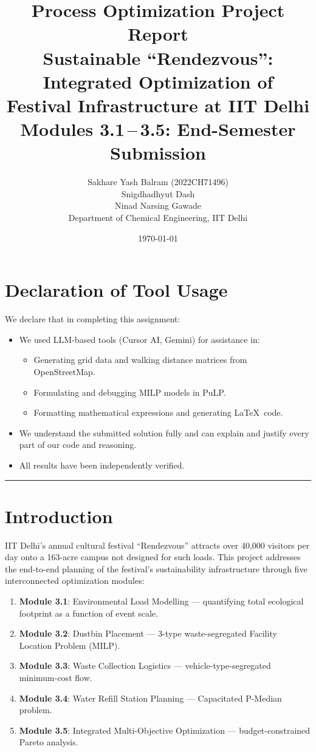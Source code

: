 \documentclass[11pt,a4paper]{article}
\title{\textbf{Process Optimization Project Report}\\[0.3cm]
\Large Sustainable ``Rendezvous'': Integrated Optimization of\\Festival Infrastructure at IIT Delhi\\[0.3cm]
\large Modules 3.1\,--\,3.5: End-Semester Submission}
\author{
    Sakhare Yash Balram (2022CH71496) \\
    Snigdhadhyut Dash \\
    Ninad Narsing Gawade \\[0.2cm]
    \small Department of Chemical Engineering, IIT Delhi
}
\date{\today}
\begin{document}
\maketitle

\section*{Declaration of Tool Usage}
We declare that in completing this assignment:
\begin{itemize}
    \item We used LLM-based tools (Cursor AI, Gemini) for assistance in:
    \begin{itemize}
        \item Generating grid data and walking distance matrices from OpenStreetMap.
        \item Formulating and debugging MILP models in PuLP.
        \item Formatting mathematical expressions and generating \LaTeX\ code.
    \end{itemize}
    \item We understand the submitted solution fully and can explain and justify every part of our code and reasoning.
    \item All results have been independently verified.
\end{itemize}

\vspace{0.3cm}\hrule\vspace{0.5cm}

\tableofcontents
\newpage

\section{Introduction}

IIT Delhi's annual cultural festival ``Rendezvous'' attracts over 40,000 visitors per day onto a 163-acre campus not designed for such loads. This project addresses the end-to-end planning of the festival's sustainability infrastructure through five interconnected optimization modules:

\begin{enumerate}
    \item \textbf{Module 3.1}: Environmental Load Modelling --- quantifying total ecological footprint as a function of event scale.
    \item \textbf{Module 3.2}: Dustbin Placement --- 3-type waste-segregated Facility Location Problem (MILP).
    \item \textbf{Module 3.3}: Waste Collection Logistics --- vehicle-type-segregated minimum-cost flow.
    \item \textbf{Module 3.4}: Water Refill Station Planning --- Capacitated P-Median problem.
    \item \textbf{Module 3.5}: Integrated Multi-Objective Optimization --- budget-constrained Pareto analysis.
\end{enumerate}
\end{document}

